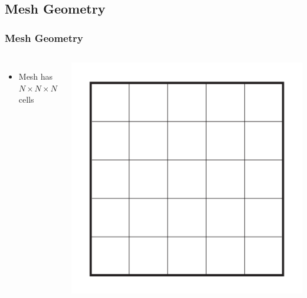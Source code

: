 \documentclass{beamer}
\begin{document}
\subsection{Mesh Geometry}
\begin{frame}
\frametitle{Mesh Geometry}
\begin{columns}[c]
\begin{itemize}
    \item Mesh has $N\times N \times N$ cells
\end{itemize}

    \includegraphics[width=\textwidth, keepaspectratio]{Mesh}
\end{columns}
\end{frame}
\end{document}
